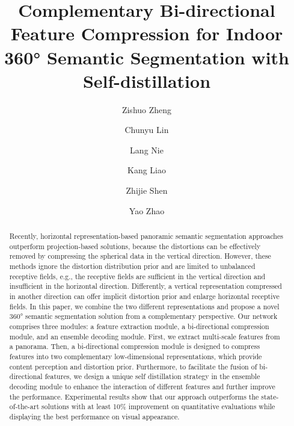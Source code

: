 \documentclass[runningheads]{llncs}
\begin{document}
\pagestyle{headings}
	\mainmatter
	\def\ECCVSubNumber{1294}  

	\title{Complementary Bi-directional Feature Compression for Indoor 360° Semantic Segmentation with Self-distillation} 

	\author{Zishuo Zheng \and
	Chunyu Lin \and
	Lang Nie\and
	Kang Liao\and
	Zhijie Shen\and
	Yao Zhao}
\maketitle
	
	\begin{abstract}
Recently, horizontal representation-based panoramic semantic segmentation approaches outperform projection-based solutions, because the distortions can be effectively removed by compressing the spherical data in the vertical direction.
		However, these methods ignore the distortion distribution prior and are limited to unbalanced receptive fields, e.g., the receptive fields are sufficient in the vertical direction and insufficient in the horizontal direction.
		Differently, a vertical representation compressed in another direction can offer implicit distortion prior and enlarge horizontal receptive fields.
		In this paper, we combine the two different representations and propose a novel 360° semantic segmentation solution from a complementary perspective.
		Our network comprises three modules: a feature extraction module, a bi-directional compression module, and an ensemble decoding module.
		First, we extract multi-scale features from a panorama.
		Then, a bi-directional compression module is designed to compress features into two complementary low-dimensional representations, which provide content perception and distortion prior.
		Furthermore, to facilitate the fusion of bi-directional features, we design a unique self distillation strategy in the ensemble decoding module to enhance the interaction of different features and further improve the performance.
		Experimental results show that our approach outperforms the state-of-the-art solutions with at least 10\% improvement on quantitative evaluations while displaying the best performance on visual appearance.
	\end{abstract}
	
\end{document}
